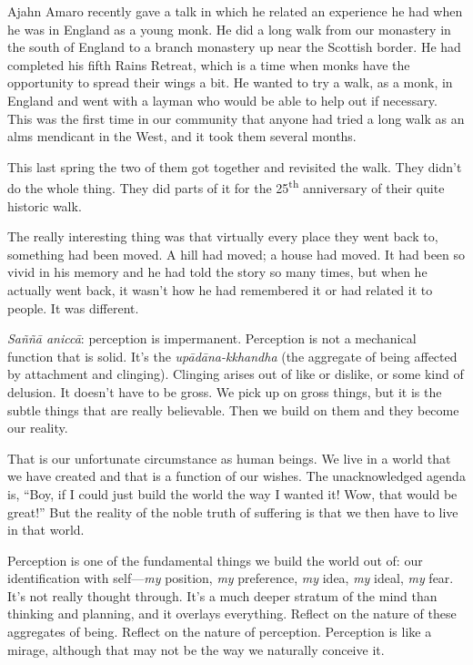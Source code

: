 Ajahn Amaro recently gave a talk in which he related an experience he
had when he was in England as a young monk. He did a long walk from our
monastery in the south of England to a branch monastery up near the
Scottish border. He had completed his fifth Rains Retreat, which is a
time when monks have the opportunity to spread their wings a bit. He
wanted to try a walk, as a monk, in England and went with a layman who
would be able to help out if necessary. This was the first time in our
community that anyone had tried a long walk as an alms mendicant in the
West, and it took them several months.

This last spring the two of them got together and revisited the walk.
They didn’t do the whole thing. They did parts of it for the
25\textsuperscript{th} anniversary of their quite historic walk.

The really interesting thing was that virtually every place they went
back to, something had been moved. A hill had moved; a house had moved.
It had been so vivid in his memory and he had told the story so many
times, but when he actually went back, it wasn’t how he had remembered
it or had related it to people. It was different.

\emph{Saññā aniccā}: perception is impermanent. Perception is not a
mechanical function that is solid. It’s the \emph{upādāna-kkhandha} (the
aggregate of being affected by attachment and clinging). Clinging arises
out of like or dislike, or some kind of delusion. It doesn’t have to be
gross. We pick up on gross things, but it is the subtle things that are
really believable. Then we build on them and they become our reality.

That is our unfortunate circumstance as human beings. We live in a world
that we have created and that is a function of our wishes. The
unacknowledged agenda is, “Boy, if I could just build the world the way
I wanted it! Wow, that would be great!” But the reality of the noble
truth of suffering is that we then have to live in that world.

Perception is one of the fundamental things we build the world out of:
our identification with self—\emph{my} position, \emph{my} preference,
\emph{my} idea, \emph{my} ideal, \emph{my} fear. It’s not really thought
through. It’s a much deeper stratum of the mind than thinking and
planning, and it overlays everything. Reflect on the nature of these
aggregates of being. Reflect on the nature of perception. Perception is
like a mirage, although that may not be the way we naturally conceive
it.

